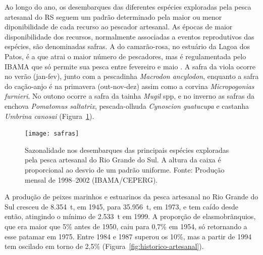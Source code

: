 \documentclass[a4paper,11pt,twoside,showtrims,onecolumn,openright,final]{memoir}
\begin{document}
Ao longo do ano, os desembarques das diferentes espécies exploradas pela pesca 
artesanal do RS seguem um padrão determinado pela maior ou menor diponibilidade de cada recurso
ao pescador artesanal. As épocas de maior disponibilidade dos recursos, normalmente associadas a eventos
reprodutivos das espécies, são denominadas safras. A do camarão-rosa, no estuário da Lagoa dos Patos, 
é a que atrai o maior número de pescadores, mas é regulamentada pelo IBAMA que só permite sua pesca 
entre fevereiro e maio \citep{mma-seap2004}. A safra da viola ocorre no verão (jan-fev), junto com
a pescadinha \emph{Macrodon ancylodon}, enquanto a safra do cação-anjo é 
na primavera (out-nov-dez) assim como a corvina \emph{Micropogonias furnieri}. 
No outono ocorre a safra da tainha \emph{Mugil} spp, e no inverno as safras da enchova \emph{Pomatomus saltatrix}, 
pescada-olhuda \emph{Cynoscion guatucupa} e castanha \emph{Umbrina canosai} (Figura~\ref{fig:safras}).


\begin{figure}
\begin{center}
\texttt{[image: safras]}
\end{center}
\caption[Sazonalidade nos desembarques das principais espécies 
         exploradas pela pesca artesanal do Rio Grande do Sul.] 
        {Sazonalidade nos desembarques das principais espécies 
         exploradas pela pesca artesanal do Rio Grande do Sul. 
	 A altura da caixa é proporcional ao desvio de um padrão uniforme. 
	 Fonte: Produção mensal de 1998--2002 (IBAMA/CEPERG). }
\label{fig:safras}	 
\end{figure}


A produção de peixes marinhos e estuarinos da pesca artesanal no Rio Grande do Sul
cresceu de 8.354~t, em 1945, para 35.956~t, em 1973, e tem caído desde então, atingindo
o mínimo de 2.533~t em 1999. A proporção de elasmobrãnquios, que era maior que 5\%
antes de 1950, caiu para 0,7\% em 1954, só retornando a esse patamar em 1975. Entre
1984 e 1987 superou os 10\%, mas a partir de 1994 tem oscilado em torno de 2,5\% (Figura~\ref{fig:historico-artesanal}).


\end{document}
